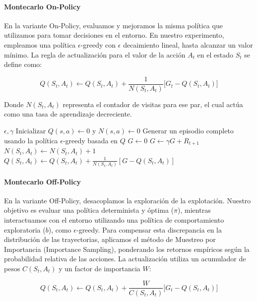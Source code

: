 \paragraph{Montecarlo On-Policy}

En la variante On-Policy, evaluamos y mejoramos la misma política que utilizamos para tomar 
decisiones en el entorno. En nuestro experimento, empleamos una política $\epsilon$-greedy con $\epsilon$ decaimiento lineal, 
hasta alcanzar un valor mínimo. La regla de actualización para el valor de la acción $A_t$ en el estado $S_t$ se define como:

$$
Q(S_t, A_t) \leftarrow Q(S_t, A_t) 
+ \frac{1}{N(S_t, A_t)} \Big[ G_t - Q(S_t, A_t) \Big]
$$

Donde $N(S_t, A_t)$ representa el contador de visitas para ese par, el cual actúa como una tasa de aprendizaje decreciente.


\begin{algorithm}[H]
\caption{Montecarlo On-Policy para Taxi-v3}
\begin{algorithmic}[1]
\small
\Require $\epsilon, \gamma$
\State Inicializar $Q(s, a) \gets 0$ y $N(s, a) \gets 0$
\State Generar un episodio completo usando la política $\epsilon$-greedy basada en $Q$
\State $G \gets 0$
\State $G \gets \gamma G + R_{t+1}$
\State $N(S_t, A_t) \gets N(S_t, A_t) + 1$
\State $Q(S_t, A_t) \leftarrow Q(S_t, A_t) + \frac{1}{N(S_t, A_t)} [G - Q(S_t, A_t)]$
\EndFor
\EndFor
\end{algorithmic}
\end{algorithm}

\paragraph{Montecarlo Off-Policy}

En la variante Off-Policy, desacoplamos la exploración de la explotación.
Nuestro objetivo es evaluar una política determinista y óptima ($\pi$),
mientras interactuamos con el entorno utilizando una política de comportamiento 
exploratoria ($b$), como $\epsilon$-greedy. Para compensar esta discrepancia en la 
distribución de las trayectorias, aplicamos el método de Muestreo por Importancia (Importance Sampling), 
ponderando los retornos empíricos según la probabilidad relativa de las acciones. La actualización utiliza un acumulador de pesos $C(S_t, A_t)$ y un factor de importancia $W$:

$$
Q(S_t, A_t) \leftarrow Q(S_t, A_t) 
+ \frac{W}{C(S_t, A_t)} \Big[ G_t - Q(S_t, A_t) \Big]
$$



